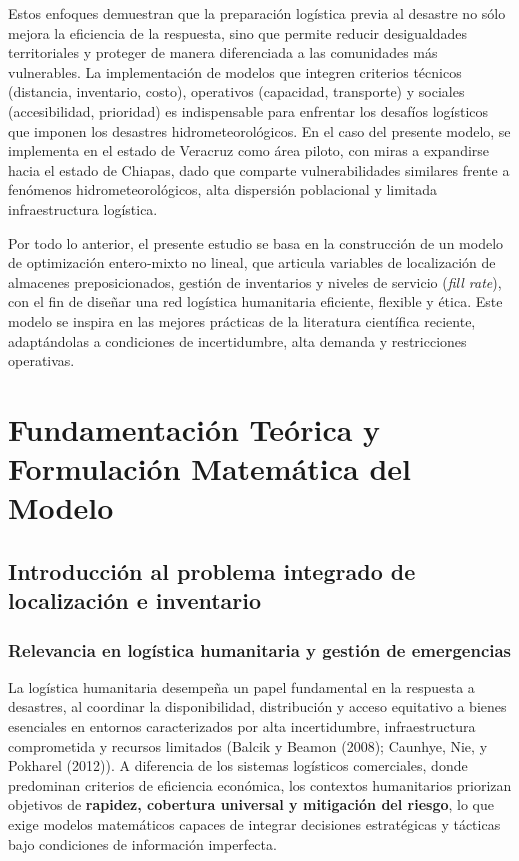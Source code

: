 \documentclass[
  spanish,
  us-letterpaper,
  DIV=11,
  numbers=noendperiod]{scrreprt}
\numberwithin{equation}{section}
\begin{document}
Estos enfoques demuestran que la preparación logística previa al
desastre no sólo mejora la eficiencia de la respuesta, sino que permite
reducir desigualdades territoriales y proteger de manera diferenciada a
las comunidades más vulnerables. La implementación de modelos que
integren criterios técnicos (distancia, inventario, costo), operativos
(capacidad, transporte) y sociales (accesibilidad, prioridad) es
indispensable para enfrentar los desafíos logísticos que imponen los
desastres hidrometeorológicos. En el caso del presente modelo, se
implementa en el estado de Veracruz como área piloto, con miras a
expandirse hacia el estado de Chiapas, dado que comparte
vulnerabilidades similares frente a fenómenos hidrometeorológicos, alta
dispersión poblacional y limitada infraestructura logística.

Por todo lo anterior, el presente estudio se basa en la construcción de
un modelo de optimización entero‑mixto no lineal, que articula variables
de localización de almacenes preposicionados, gestión de inventarios y
niveles de servicio (\emph{fill rate}), con el fin de diseñar una red
logística humanitaria eficiente, flexible y ética. Este modelo se
inspira en las mejores prácticas de la literatura científica reciente,
adaptándolas a condiciones de incertidumbre, alta demanda y
restricciones operativas.


\chapter{Fundamentación Teórica y Formulación Matemática del
Modelo}\label{fundamentaciuxf3n-teuxf3rica-y-formulaciuxf3n-matemuxe1tica-del-modelo}

\section{Introducción al problema integrado de localización e
inventario}\label{introducciuxf3n-al-problema-integrado-de-localizaciuxf3n-e-inventario}

\subsection{Relevancia en logística humanitaria y gestión de
emergencias}\label{relevancia-en-loguxedstica-humanitaria-y-gestiuxf3n-de-emergencias}

La logística humanitaria desempeña un papel fundamental en la respuesta
a desastres, al coordinar la disponibilidad, distribución y acceso
equitativo a bienes esenciales en entornos caracterizados por alta
incertidumbre, infraestructura comprometida y recursos limitados (Balcik
y Beamon (2008); Caunhye, Nie, y Pokharel (2012)). A diferencia de los
sistemas logísticos comerciales, donde predominan criterios de
eficiencia económica, los contextos humanitarios priorizan objetivos de
\textbf{rapidez, cobertura universal y mitigación del riesgo}, lo que
exige modelos matemáticos capaces de integrar decisiones estratégicas y
tácticas bajo condiciones de información imperfecta.
\end{document}
